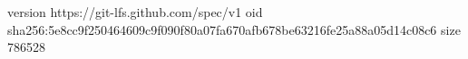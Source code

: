 version https://git-lfs.github.com/spec/v1
oid sha256:5e8cc9f250464609c9f090f80a07fa670afb678be63216fe25a88a05d14c08c6
size 786528
